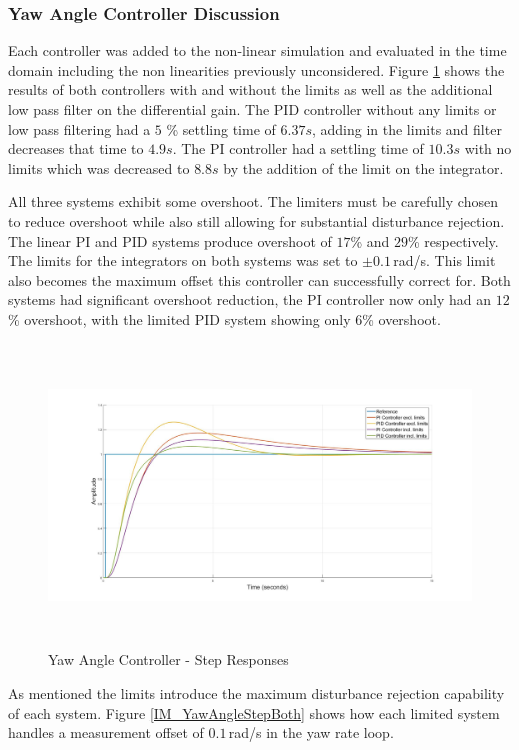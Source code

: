 		\subsubsection{Yaw Angle Controller Discussion}	
		Each controller was added to the non-linear simulation and evaluated in the time domain including the non linearities previously unconsidered. Figure \ref{IM_YawAngleStep} shows the results of both controllers with and without the limits as well as the additional low pass filter on the differential gain. The PID controller without any limits or low pass filtering had a $5$ \% settling time of $6.37s$, adding in the limits and filter decreases that time to $4.9s$. The PI controller had a settling time of $10.3s$ with no limits which was decreased to $8.8s$ by the addition of the limit on the integrator.
		
		All three systems exhibit some overshoot. The limiters must be carefully chosen to reduce overshoot while also still allowing for substantial disturbance rejection. The linear PI and PID systems produce overshoot of $17$\% and $29$\% respectively. The limits for the integrators on both systems was set to $\pm 0.1$\,rad/s. This limit also becomes the maximum offset this controller can successfully correct for. Both systems had significant overshoot reduction, the PI controller now only had an $12$\% overshoot, with the limited PID system showing only $6$\% overshoot. 
				
		\begin{figure}[H]
			\centering
			\includegraphics[height = 8cm]{../Design/Matlab/Controllers/yaw_angle_step_both_limits.jpg}
			\caption{Yaw Angle Controller -  Step Responses}
			\label{IM_YawAngleStep}
		\end{figure}
		
		As mentioned the limits introduce the maximum disturbance rejection capability of each system. Figure \ref{IM_YawAngleStepBoth} shows how each limited system handles a measurement offset of $0.1$\,rad/s in the yaw rate loop.
		
